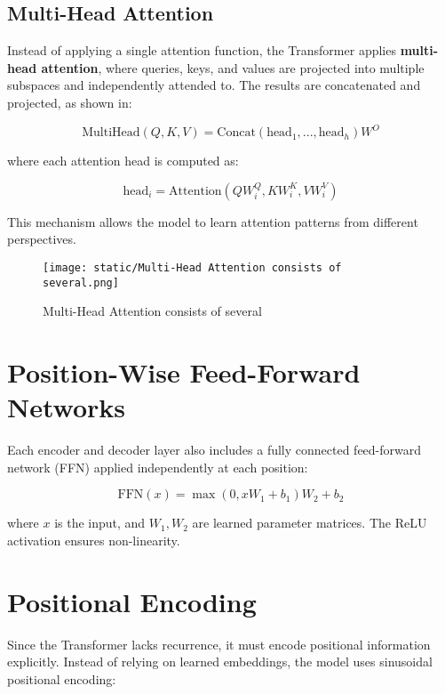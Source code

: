 \documentclass{article}
\begin{document}
\subsection{Multi-Head Attention}

Instead of applying a single attention function, the Transformer applies \textbf{multi-head attention}, where queries, keys, and values are projected into multiple subspaces and independently attended to. The results are concatenated and projected, as shown in:

\begin{equation}
    \text{MultiHead}(Q, K, V) = \text{Concat}(\text{head}_1, ..., \text{head}_h) W^O
\end{equation}

where each attention head is computed as:

\begin{equation}
    \text{head}_i = \text{Attention}(Q W_i^Q, K W_i^K, V W_i^V)
\end{equation}

This mechanism allows the model to learn attention patterns from different perspectives.

\begin{figure}[h!]
    \centering
    \texttt{[image: static/Multi-Head Attention consists of several.png]}
    \caption{Multi-Head Attention consists of several}
\end{figure}


\section{Position-Wise Feed-Forward Networks}

Each encoder and decoder layer also includes a fully connected feed-forward network (FFN) applied independently at each position:

\begin{equation}
    \text{FFN}(x) = \max(0, x W_1 + b_1) W_2 + b_2
\end{equation}

where $x$ is the input, and $W_1, W_2$ are learned parameter matrices. The ReLU activation ensures non-linearity.

\section{Positional Encoding}

Since the Transformer lacks recurrence, it must encode positional information explicitly. Instead of relying on learned embeddings, the model uses sinusoidal positional encoding:
\end{document}
